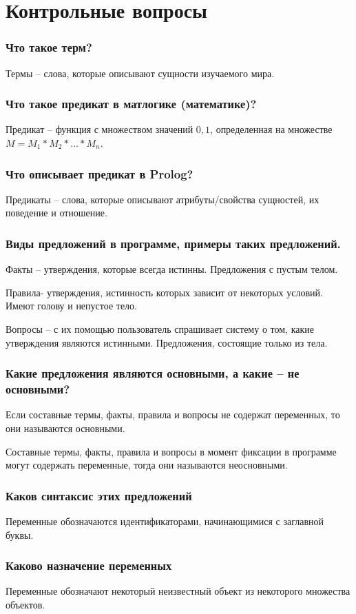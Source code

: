 \documentclass[12pt,a4paper,oneside]{report}
\begin{document}
\chapter*{Контрольные вопросы}
\subsection*{Что такое терм?}
\quad Термы – слова, которые описывают сущности изучаемого мира.
\subsection*{Что такое предикат в матлогике (математике)?}
\quad Предикат – функция с множеством значений ${0, 1}$, определенная на множестве $M = M_1 * M_2 * … * M_n$.
\subsection*{Что описывает предикат в Prolog?}
\quad Предикаты – слова, которые описывают атрибуты/свойства сущностей, их поведение и отношение.
\subsection*{Виды предложений в программе, примеры таких предложений.}
\quad Факты – утверждения, которые всегда истинны. Предложения с пустым телом.

Правила- утверждения, истинность которых зависит от некоторых условий. Имеют голову и непустое тело.

Вопросы – с их помощью пользователь спрашивает систему о том, какие утверждения являются истинными. Предложения, состоящие только из тела.
\subsection*{Какие предложения являются основными, а какие – не основными?}
\quad Если составные термы, факты, правила и вопросы не содержат переменных, то они называются основными. 

Составные термы, факты, правила и вопросы в момент фиксации в программе могут содержать переменные, тогда они называются неосновными.

\subsection*{Каков синтаксис этих предложений} 
\quad Переменные обозначаются идентификаторами, начинающимися с заглавной буквы. 
\subsection*{Каково назначение переменных}
\quad Переменные обозначают некоторый неизвестный объект из некоторого множества объектов. 
\end{document}
